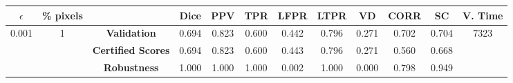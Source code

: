 \begin{longtable}{ c  c | c | c  c  c  c  c  c  c c c}
\toprule \textbf{$\epsilon$} & \textbf{\% pixels} & & \textbf{Dice} & \textbf{PPV} & \textbf{TPR} & \textbf{LFPR} & \textbf{LTPR} & \textbf{VD} & \textbf{CORR} & \textbf{SC} & \textbf{V. Time} \\
\midrule 
\multirow{3}{*}{0.001}  & \multirow{3}{*}{1} &\textbf{Validation} & 0.694 & 0.823 & 0.600 & 0.442 & 0.796 & 0.271 & 0.702 & 0.704 & \multirow{3}{*}{7323} \\
 & & \textbf{Certified Scores} & 0.694 & 0.823 & 0.600 & 0.443 & 0.796 & 0.271 & 0.560 & 0.668 & \\
& & \textbf{Robustness} & 1.000 & 1.000 & 1.000 & 0.002 & 1.000 & 0.000 & 0.798 & 0.949 & \\
\end{longtable}